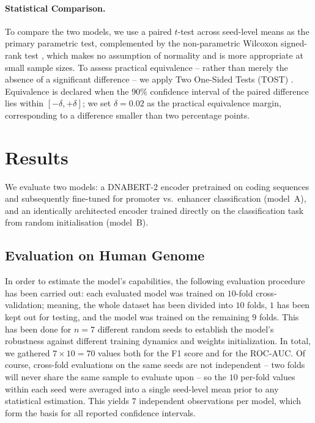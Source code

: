\documentclass[11pt,a4paper,twoside]{article}
\begin{document}
\paragraph{Statistical Comparison.}
To compare the two models, we use a paired $t$-test across seed-level means as the primary parametric test, complemented by the non-parametric Wilcoxon signed-rank test \cite{wilcoxon}, which makes no assumption of normality and is more appropriate at small sample sizes.
To assess practical equivalence -- rather than merely the absence of a significant difference -- we apply Two One-Sided Tests (TOST) \cite{tost}.
Equivalence is declared when the $90\%$ confidence interval of the paired difference lies within $[-\delta, +\delta]$; we set $\delta = 0.02$ as the practical equivalence margin, corresponding to a difference smaller than two percentage points.

\section{Results}
\label{sec:results}

We evaluate two models: a DNABERT-2 encoder pretrained on coding sequences
and subsequently fine-tuned for promoter vs.\ enhancer classification
(model~A), and an identically architected encoder trained directly on the
classification task from random initialisation (model~B).

\subsection{Evaluation on Human Genome}
In order to estimate the model's capabilities, the following evaluation procedure has been carried out: each evaluated model was trained on $10$-fold cross-validation; meaning, the whole dataset has been divided into $10$ folds, $1$ has been kept out for testing, and the model was trained on the remaining $9$ folds.
This has been done for $n = 7$ different random seeds to establish the model's robustness against different training dynamics and weights initialization.
In total, we gathered $7 \times 10 = 70$ values both for the F1 score and for the ROC-AUC. Of course, cross-fold evaluations on the same seeds are not independent -- two folds will never share the same sample to evaluate upon -- so the $10$ per-fold values within each seed were averaged into a single seed-level mean prior to any statistical estimation. This yields $7$ independent observations per model, which form the basis for all reported confidence intervals.
\end{document}

